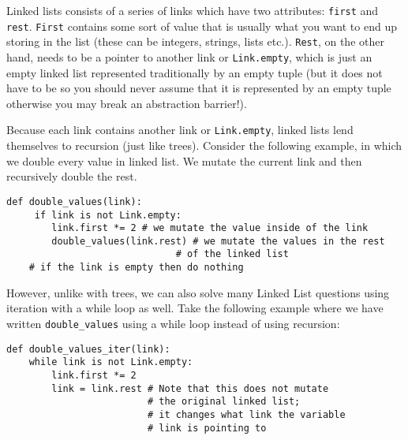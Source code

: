\begin{blocksection}
Linked lists consists of a series of links which have two attributes: \lstinline{first} and \lstinline{rest}. \lstinline{First} contains some sort of value that is usually what you want to end up storing in the list (these can be integers, strings, lists etc.). \lstinline{Rest}, on the other hand, needs to be a pointer to another link or \lstinline{Link.empty}, which is just an empty linked list represented traditionally by an empty tuple (but it does not have to be so you should never assume that it is represented by an empty tuple otherwise you may break an abstraction barrier!).

Because each link contains another link or \lstinline{Link.empty}, linked lists lend themselves to recursion (just like trees). Consider the following example, in which we double every value in linked list. We mutate the current link and then recursively double the rest.
\vspace{1.5mm}
\begin{lstlisting}
def double_values(link):
     if link is not Link.empty:
        link.first *= 2 # we mutate the value inside of the link
        double_values(link.rest) # we mutate the values in the rest
                              # of the linked list
    # if the link is empty then do nothing
\end{lstlisting}

However, unlike with trees, we can also solve many Linked List questions using iteration with a while loop as well. Take the following example where we have written \lstinline{double_values} using a while loop instead of using recursion:
\vspace{1.5mm}
\begin{lstlisting}
def double_values_iter(link):
    while link is not Link.empty:
        link.first *= 2
        link = link.rest # Note that this does not mutate
                         # the original linked list;
                         # it changes what link the variable
                         # link is pointing to
\end{lstlisting}
\end{blocksection}
